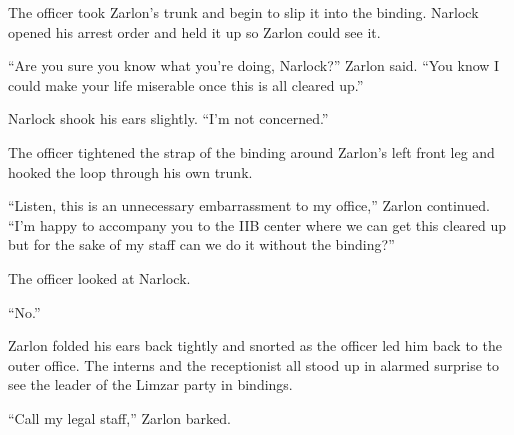 The officer took Zarlon's trunk and begin to slip it into the binding. Narlock opened his arrest
order and held it up so Zarlon could see it.

``Are you sure you know what you're doing, Narlock?'' Zarlon said. ``You know I could make your
life miserable once this is all cleared up.''

Narlock shook his ears slightly. ``I'm not concerned.''

The officer tightened the strap of the binding around Zarlon's left front leg and hooked the
loop through his own trunk.

``Listen, this is an unnecessary embarrassment to my office,'' Zarlon continued. ``I'm happy to
accompany you to the IIB center where we can get this cleared up but for the sake of my staff
can we do it without the binding?''

The officer looked at Narlock.

``No.''
 
Zarlon folded his ears back tightly and snorted as the officer led him back to the outer office.
The interns and the receptionist all stood up in alarmed surprise to see the leader of the
Limzar party in bindings.

``Call my legal staff,'' Zarlon barked.


